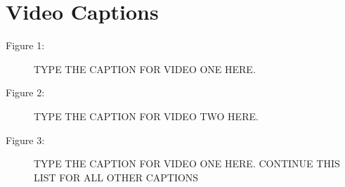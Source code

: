 \documentclass[preprint,5p]{elsarticle}
\begin{document}


\pagebreak

\section*{Video Captions}

\begin{description}
\item[Figure 1:]  TYPE THE CAPTION FOR VIDEO ONE HERE.
\item[Figure 2:]  TYPE THE CAPTION FOR VIDEO TWO HERE.
\item[Figure 3:]  TYPE THE CAPTION FOR VIDEO ONE HERE.  CONTINUE THIS LIST FOR ALL OTHER CAPTIONS
\end{description}
\end{document}
